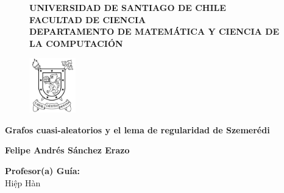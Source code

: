 
\begin{titlepage}


\begin{figure}[ht]
\hspace{0.1\linewidth}
\begin{minipage}[b]{0.75\linewidth}
\begin{center}
\textbf{\Large{UNIVERSIDAD DE SANTIAGO DE CHILE}}\\
\textbf{FACULTAD DE CIENCIA}\\
\textbf{DEPARTAMENTO DE MATEMÁTICA Y CIENCIA DE LA COMPUTACIÓN}
\end{center}	
\end{minipage}
\begin{minipage}[b]{0.1\linewidth}
\centering
\includegraphics[width=2cm]{./Imágenes/logo5}
\end{minipage}
\end{figure}

\begin{center}
\vspace{2.5cm}

\begin{center}
\Large{\textbf{Grafos cuasi-aleatorios y el lema de regularidad de Szemerédi}}
\end{center}
\smallskip

\begin{center}
{\textbf{Felipe Andrés Sánchez Erazo}}
\end{center}
\vspace{2.5cm}

\hspace{0.45\linewidth}
\begin{minipage}[b]{0.45\linewidth}
\begin{flushleft}
\textbf{Profesor(a) Guía:}\\
Hi\d{ê}p Hàn
\end{flushleft}
\end{minipage}


\end{center}
\end{titlepage}
